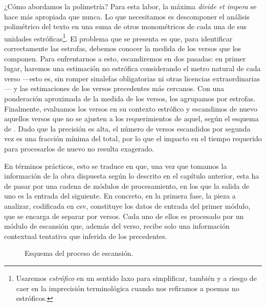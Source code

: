 ¿Cómo abordamos la polimetría? Para esta labor, la máxima \textit{divide et impera} se hace más apropiada que nunca. Lo que necesitamos es descomponer el análisis polimétrico del texto en una suma de  otros monométricos de cada una de sus unidades estróficas\footnote{Usaremos \textit{estrófico} en un sentido laxo para simplificar, también y a riesgo de caer en la imprecisión terminológica cuando nos refiramos a poemas no estróficos.}.  El problema que se presenta es que, para identificar correctamente las estrofas, debemos conocer la medida de los versos que los componen. Para enfrentarnos a esto, escandiremos en dos pasadas: en primer lugar, haremos una estimación no estrófica considerando el metro natural de cada verso —esto es, sin romper sinalefas obligatorias ni otras licencias extraordinarias— y las estimaciones de los versos precedentes más cercanos. Con una ponderación aproximada de la medida de los versos, los agrupamos por estrofas. Finalmente, evaluamos los versos en su contexto estrófico y escandimos de nuevo aquellos versos que no se ajusten a los requerimientos de aquel, según el esquema de . Dado que la precisión es alta, el número de versos escandidos por segunda vez es una fracción mínima del total, por lo que el impacto en el tiempo requerido para procesarlos de nuevo no resulta exagerado.

En términos prácticos, esto se traduce en que, una vez que tomamos la información de la obra dispuesta según lo descrito en el capítulo anterior, esta ha de pasar por una cadena de módulos de procesamiento, en los que la salida de uno es la entrada del siguiente. En concreto, en la primera fase, la pieza a analizar, codificada en \ac{csv}, constituye los datos de entrada del primer módulo, que se encarga de separar por versos. Cada uno de ellos es procesado por un módulo de escansión que, además del verso, recibe solo una información contextual tentativa que inferida de los precedentes.

\begin{figure}[!ht]
	\centering
		
	\caption{Esquema del proceso de escansión.}
	\label{fig:escansion}
\end{figure}

